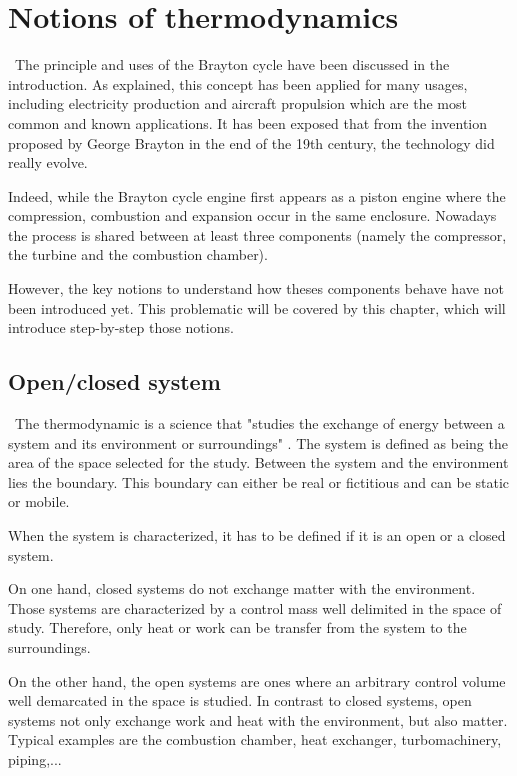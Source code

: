 ﻿\graphicspath{{Chapitre_2/Images/}}
\chapter{Notions of thermodynamics}\label{C2}
\quad\, The principle and uses of the Brayton cycle have been discussed in the introduction. As explained, this concept has been applied for many usages, including electricity production and aircraft propulsion which are the most common and known applications. It has been exposed that from the invention proposed by George Brayton in the end of the 19th century, the technology did really evolve.

Indeed, while the Brayton cycle engine first appears as a  piston engine where the compression, combustion and expansion occur in the same enclosure. Nowadays
the process is shared between at least three components (namely the compressor, the turbine and the combustion chamber).

However, the key notions to understand how theses components behave have not been introduced yet. This problematic will be covered by this chapter, which will introduce step-by-step those notions.
\section{Open/closed system}\label{sect:C2_Sys}
\quad\,  The thermodynamic is a science that "studies the exchange of energy between a system and its environment or surroundings" \cite{thermoApp_1}.
The system is defined as being the area of the space selected for the study. Between the system and the environment lies the boundary. This boundary can either be real or fictitious and can be static or mobile.

When the system is characterized, it has to be defined if it is an open or a closed system.

On one hand, closed systems do not exchange matter with the environment. Those systems are characterized by a control mass well delimited in the space of study. Therefore, only heat or work can be transfer from the system to the surroundings.

On the other hand, the open systems are ones where an arbitrary control volume well demarcated in the space is studied. In contrast to closed systems, open systems not only exchange work and heat with the environment, but also matter. Typical examples are the combustion chamber, heat exchanger, turbomachinery, piping,...

